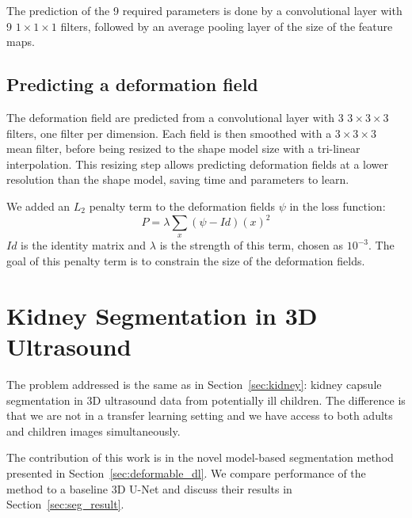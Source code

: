The prediction of the 9 required parameters is done by a convolutional layer with 9 $1 \times 1 \times 1$ filters, followed by an average pooling layer of the size of the feature maps. 

\subsection{Predicting a deformation field}

The deformation field are predicted from a convolutional layer with 3 $3 \times 3 \times 3$ filters, one filter per dimension. Each field is then smoothed with a $3 \times 3 \times 3$ mean filter, before being resized to the shape model size with a tri-linear interpolation. This resizing step allows predicting deformation fields at a lower resolution than the shape model, saving time and parameters to learn.

We added an $L_2$ penalty term to the deformation fields $\psi$ in the loss function:
\begin{equation}
    P = \lambda \sum_x \left( \psi - Id \right)(x)^2
\end{equation}
$Id$ is the identity matrix and $\lambda$ is the strength of this term, chosen as $10^{-3}$. The goal of this penalty term is to constrain the size of the deformation fields.



\section{Kidney Segmentation in 3D Ultrasound}
\label{sec:seg_data}

The problem addressed is the same as in Section~\ref{sec:kidney}: kidney capsule segmentation in 3D ultrasound data from potentially ill children. The difference is that we are not in a transfer learning setting and we have access to both adults and children images simultaneously.

The contribution of this work is in the novel model-based segmentation method presented in Section~\ref{sec:deformable_dl}. We compare performance of the method to a baseline 3D U-Net and discuss their results in Section~\ref{sec:seg_result}.

